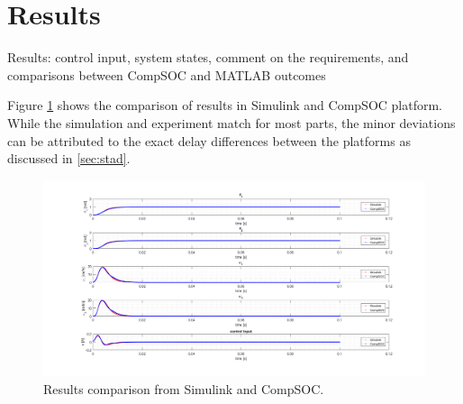 \section{Results}


\color{red}
Results:	control	input,	system	states,	comment	on	the	requirements,	and	comparisons	
between	CompSOC and	MATLAB	outcomes
\color{black}

Figure \ref{fig:finalresult} shows the comparison of results in Simulink and CompSOC platform. While the simulation and experiment match for most parts, the minor deviations can be attributed to the exact delay differences between the platforms as discussed in \ref{sec:stad}.
\begin{figure}[h]
	\begin{center}
		\includegraphics[width=\linewidth]{img/finalresult}
		\caption{Results comparison from Simulink and CompSOC.}
		\label{fig:finalresult}
	\end{center}
\end{figure}
